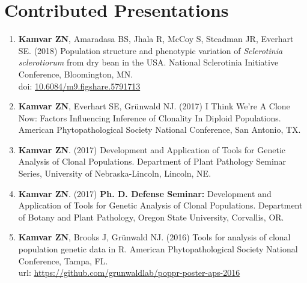 \section{Contributed Presentations}


\begin{enumerate}[leftmargin = 14pt]

	\item \textbf{Kamvar ZN}, Amaradasa BS, Jhala R, McCoy S, Steadman JR,
	Everhart SE. (2018) Population structure and phenotypic variation of
	\textit{Sclerotinia sclerotiorum} from dry bean in the USA. National Sclerotinia Initiative Conference, Bloomington, MN.\\
	doi: \href{https://doi.org/10.6084/m9.figshare.5791713}{10.6084/m9.figshare.5791713}

	\vspace{3pt}

	\item \textbf{Kamvar ZN}, Everhart SE, Gr\"unwald NJ. (2017) I Think We're
	A Clone Now: Factors Influencing Inference of Clonality In Diploid
	Populations. American Phytopathological Society National Conference,
	San Antonio, TX.

	\vspace{3pt}

	\item \textbf{Kamvar ZN}. (2017) Development and Application of Tools
	for Genetic Analysis of Clonal Populations. Department of Plant Pathology
	Seminar Series, University of Nebraska-Lincoln, Lincoln, NE.

	\vspace{3pt}

	\item \textbf{Kamvar ZN}. (2017) \textbf{Ph. D. Defense Seminar:} Development and
	Application of Tools for Genetic Analysis of Clonal Populations. Department
	of Botany and Plant Pathology, Oregon State University, Corvallis, OR.

	\vspace{3pt}

	\item \textbf{Kamvar ZN}, Brooks J, Gr\"unwald NJ. (2016) Tools for analysis
	of clonal population genetic data in R. American Phytopathological Society
	National Conference, Tampa, FL.\\
	url: \href{https://github.com/grunwaldlab/poppr-poster-aps-2016#readme}{https://github.com/grunwaldlab/poppr-poster-aps-2016}

	\vspace{3pt}


\end{enumerate}
